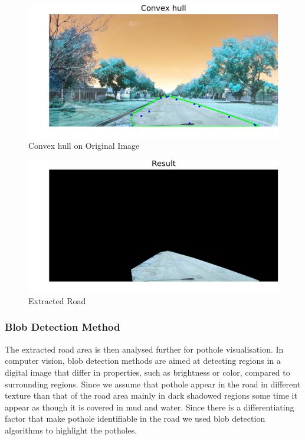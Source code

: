 \documentclass[journal]{IEEEtran}
\begin{document}
\begin{figure}[!htb]
\begin{center}
\includegraphics[scale=1]{Images/6_Convex_hull.png}
\end{center}
\caption{Convex hull on Original Image}
\end{figure}
\newpage

\begin{figure}[!htb]
\begin{center}
\includegraphics[scale=0.65]{Images/7_Result.png}
\end{center}
\caption{Extracted Road}
\end{figure}

\newpage

\vspace*{.5cm}


\subsubsection*{Blob Detection Method}

The extracted road area is then analysed further for pothole visualisation. In computer vision, blob detection methods are aimed at detecting regions in a digital image that differ in properties, such as brightness or color, compared to surrounding regions. Since we assume that pothole appear in the road in different texture than that of the road area mainly in dark shadowed regions some time it appear as though it is covered in mud and water. Since there is a differentiating factor that make pothole identifiable in the road we used blob detection algorithms to highlight the potholes.
\end{document}
